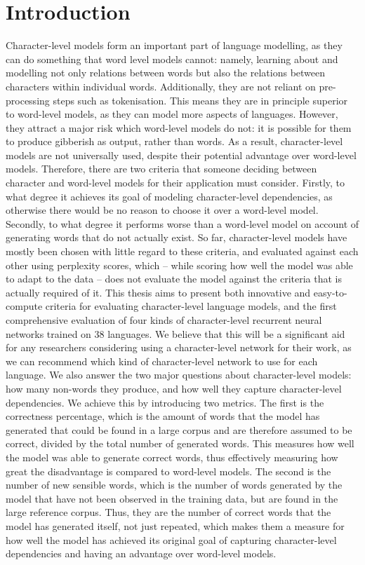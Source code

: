 \documentclass[11pt,a4paper,twoside,openright]{scrbook}
\begin{document}
\chapter{Introduction}
Character-level models form an important part of language modelling, as they can do something that word level models cannot: namely, learning about and modelling not only relations between words but also the relations between characters within individual words. Additionally, they are not reliant on pre-processing steps such as tokenisation. This means they are in principle superior to word-level models, as they can model more aspects of languages. However, they attract a major risk which word-level models do not: it is possible for them to produce gibberish as output, rather than words. As a result, character-level models are not universally used, despite their potential advantage over word-level models.
Therefore, there are two criteria that someone deciding between character and word-level models for their application must consider. Firstly, to what degree it achieves its goal of modeling character-level dependencies, as otherwise there would be no reason to choose it over a word-level model. Secondly, to what degree it performs worse than a word-level model on account of generating words that do not actually exist. So far, character-level models have mostly been chosen with little regard to these criteria, and evaluated against each other using perplexity scores, which – while scoring how well the model was able to adapt to the data – does not evaluate the model against the criteria that is actually required of it.
This thesis aims to present both innovative and easy-to-compute criteria for evaluating character-level language models, and the first comprehensive evaluation of four kinds of character-level recurrent neural networks trained on 38 languages. We believe that this will be a significant aid for any researchers considering using a character-level network for their work, as we can recommend which kind of character-level network to use for each language. We also answer the two major questions about character-level models: how many non-words they produce, and how well they capture character-level dependencies.
We achieve this by introducing two metrics. The first is the correctness percentage, which is the amount of words that the model has generated that could be found in a large corpus and are therefore assumed to be correct, divided by the total number of generated words. This measures how well the model was able to generate correct words, thus effectively measuring how great the disadvantage is compared to word-level models. The second is the number of new sensible words, which is the number of words generated by the model that have not been observed in the training data, but are found in the large reference corpus. Thus, they are the number of correct words that the model has generated itself, not just repeated, which makes them a measure for how well the model has achieved its original goal of capturing character-level dependencies and having an advantage over word-level models.
\end{document}
